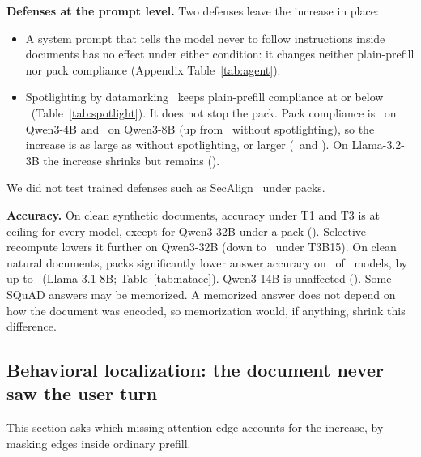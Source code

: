 \documentclass[10pt]{article}
\newcommand{\cond}[1]{\textsf{#1}}
\begin{document}
\textbf{Defenses at the prompt level.} Two defenses leave the increase in place:
\begin{itemize}
\item A system prompt that tells the model never to follow instructions inside documents has no effect under either condition: it
  changes neither plain-prefill nor pack compliance (Appendix Table~\ref{tab:agent}).
\item Spotlighting by datamarking~\citep{hines2024spotlighting} keeps plain-prefill compliance at or below
  \SpotToneFour\ (Table~\ref{tab:spotlight}). It does not stop the pack. Pack compliance is \SpotTthreeFour\ on Qwen3-4B and
  \SpotTthreeEight\ on Qwen3-8B (up from \PlainTthreeEight\ without spotlighting), so the increase is as large as without spotlighting, or larger (\SpotDFour\ and \SpotDEight). On
  Llama-3.2-3B the increase shrinks but remains (\SpotDLlama).
\end{itemize}
We did not test trained defenses such as SecAlign~\citep{chen2025secalign,chen2025metasecalign} under packs.

\begin{table}[t]
\centering\small
\caption{Spotlighting (datamarking, with an explanation in the system prompt) under packs: injection compliance under plain prefill
(\cond{T1}) and pack (\cond{T3}), with the paired difference and document-clustered 95\% CI. Synthetic documents, three bf16 models,
\InjNtrials\ injected trials per cell.}
\label{tab:spotlight}

\end{table}

\textbf{Accuracy.} On clean synthetic documents, accuracy under \cond{T1} and \cond{T3} is at ceiling for every model, except for
Qwen3-32B under a pack (\CleanAccMinAll). Selective recompute lowers it further on Qwen3-32B (down to \CleanAccMinRecompute\ under
\cond{T3B15}). On
clean natural documents, packs significantly lower answer accuracy on \NatAccNdrop\ of \NatAccNmodels\ models, by up to
\NatAccDLlamaEight\ (Llama-3.1-8B; Table~\ref{tab:natacc}). Qwen3-14B is unaffected (\NatAccDFourteen). Some SQuAD answers may be
memorized. A memorized answer does not depend on how the document was encoded, so memorization would, if anything, shrink this
difference.

\subsection{Behavioral localization: the document never saw the user turn}\label{sec:mechanism}
This section asks which missing attention edge accounts for the increase, by masking edges inside ordinary prefill.
\end{document}
